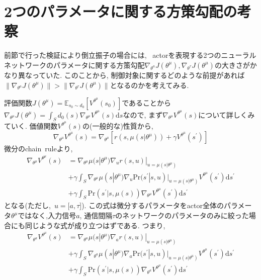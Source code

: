 \documentclass{jsarticle}
\newcommand{\expect}{\mathbb{E}}
\begin{document}
{\section{2つのパラメータに関する方策勾配の考察}
前節で行った検証により倒立振子の場合には, ~actorを表現する2つのニューラルネットワークのパラメータに関する方策勾配$\nabla_{\theta^a}J(\theta^{\mu}), \nabla_{\theta^{\tau}}J(\theta^{\mu})$の大きさがかなり異なっていた. このことから, 制御対象に関するどのような前提があれば$\|\nabla_{\theta^a}J(\theta^{\mu})\|>\|\nabla_{\theta^{\tau}}J(\theta^{\mu})\|$となるのかを考えてみる.\par
評価関数$J(\theta^{\mu})=\expect_{s_0\sim d_0}[V^{\theta^{\mu}}(s_0)]$であることから$\nabla_{\theta^{\mu}}J(\theta^{\mu})=\int_{S}d_0(s)\nabla_{\theta^{\mu}}V^{\theta^{\mu}}(s)\textrm{d}s$なので, まず$\nabla_{\theta^{\mu}}V^{\theta^{\mu}}(s)$について詳しくみていく. 価値関数$V^{\theta^{\mu}}(s)$の(一般的な)性質から, 
\begin{equation}
	\nabla_{\theta^{\mu}}V^{\theta^{\mu}}(s) = \nabla_{\theta^{\mu}}[r(s, \mu(s|\theta^{\mu}))+\gamma V^{\theta^{\mu}}(s^{\prime})]
\end{equation}
微分のchain~ruleより,
\begin{align}
	\nabla_{\theta^{\mu}}V^{\theta^{\mu}}(s) &= \nabla_{\theta^{\mu}}\mu(s|\theta^{\mu})\nabla_ur(s, u)|_{u=\mu(s|\theta^{\mu})}\nonumber\\
	&+\gamma\int_{S}\nabla_{\theta^{\mu}}\mu(s|\theta^{\mu})\nabla_{u}\textrm{Pr}(s^{\prime}|s, u)|_{u=\mu(s|\theta^{\mu})}V^{\theta^{\mu}}(s^{\prime})\textrm{d}s^{\prime}\nonumber\\
	&+\gamma\int_{S}\textrm{Pr}(s^{\prime}|s, \mu(s))\nabla_{\theta^{\mu}}V^{\theta^{\mu}}(s^{\prime})\textrm{d}s^{\prime} \label{recurrence}
\end{align}
となる(ただし,~$u=[a,\tau$]). この式は微分するパラメータをactor全体のパラメータ$\theta^{\mu}$ではなく,入力信号$a$, 通信間隔$\tau$のネットワークのパラメータのみに絞った場合にも同じような式が成り立つはずである. つまり,
\begin{align}
	\nabla_{\theta^{a}}V^{\theta^{\mu}}(s) &= \nabla_{\theta^{a}}\mu(s|\theta^{\mu})\nabla_{a}r(s, u)|_{u=\mu(s|\theta^{\mu})}\nonumber\\
	&+\gamma\int_{S}\nabla_{\theta^{a}}\mu(s|\theta^{\mu})\nabla_{a}\textrm{Pr}(s^{\prime}|s, u)|_{u=\mu(s|\theta^{\mu})}V^{\theta^{\mu}}(s^{\prime})\textrm{d}s^{\prime}\nonumber\\
	&+\gamma\int_{S}\textrm{Pr}(s^{\prime}|s, \mu(s))\nabla_{\theta^{a}}V^{\theta^{\mu}}(s^{\prime})\textrm{d}s^{\prime} \label{recurrence_a}

\end{align}}
\end{document}
